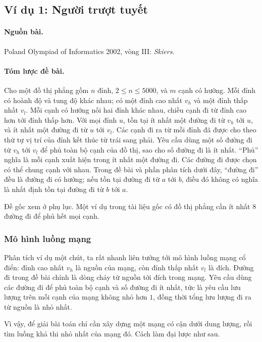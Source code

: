\documentclass[11pt]{article}
\begin{document}
\subsection{Ví dụ 1: Người trượt tuyết}

\paragraph{Nguồn bài.}
Poland Olympiad of Informatics 2002, vòng III: \emph{Skiers}.

\paragraph{Tóm lược đề bài.}
Cho một đồ thị phẳng gồm \(n\) đỉnh, \(2\le n\le 5000\), và \(m\) cạnh có
hướng. Mỗi đỉnh có hoành độ và tung độ khác nhau; có một đỉnh cao nhất \(v_h\)
và một đỉnh thấp nhất \(v_l\). Mỗi cạnh có hướng nối hai đỉnh khác nhau, chiều
cạnh đi từ đỉnh cao hơn tới đỉnh thấp hơn. Với mọi đỉnh \(u\), tồn tại ít nhất
một đường đi từ \(v_h\) tới \(u\), và ít nhất một đường đi từ \(u\) tới
\(v_l\). Các cạnh đi ra từ mỗi đỉnh đã được cho theo thứ tự vị trí của đỉnh
kết thúc từ trái sang phải. Yêu cầu dùng một số đường đi từ \(v_h\) tới \(v_l\)
để phủ toàn bộ cạnh của đồ thị, sao cho số đường đi là ít nhất. ``Phủ'' nghĩa
là mỗi cạnh xuất hiện trong ít nhất một đường đi. Các đường đi được chọn có thể
chung cạnh với nhau. Trong đề bài và phần phân tích dưới đây, ``đường đi'' đều
là đường đi có hướng; nếu tồn tại đường đi từ \(a\) tới \(b\), điều đó không có
nghĩa là nhất định tồn tại đường đi từ \(b\) tới \(a\).

Đề gốc xem ở phụ lục. Một ví dụ trong tài liệu gốc có đồ thị phẳng cần ít nhất
\(8\) đường đi để phủ hết mọi cạnh.

\subsubsection{Mô hình luồng mạng}

Phân tích ví dụ một chút, ta rất nhanh liên tưởng tới mô hình luồng mạng cổ
điển: đỉnh cao nhất \(v_h\) là nguồn của mạng, còn đỉnh thấp nhất \(v_l\) là
đích. Đường đi trong đề bài chính là dòng chảy từ nguồn tới đích trong mạng.
Yêu cầu dùng các đường đi để phủ toàn bộ cạnh và số đường đi ít nhất, tức là
yêu cầu lưu lượng trên mỗi cạnh của mạng không nhỏ hơn \(1\), đồng thời tổng
lưu lượng đi ra từ nguồn là nhỏ nhất.

Vì vậy, để giải bài toán chỉ cần xây dựng một mạng có cận dưới dung lượng, rồi
tìm luồng khả thi nhỏ nhất của mạng đó. Cách làm đại lược như sau.
\end{document}
